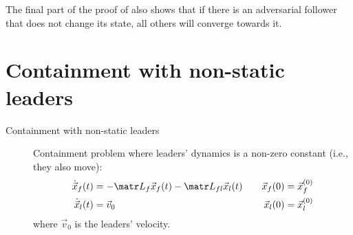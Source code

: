 \begin{remark}
    The final part of the proof of  also shows that if there is an adversarial follower that does not change its state, all others will converge towards it.
\end{remark}


\section{Containment with non-static leaders}

\begin{description}
    \item[Containment with non-static leaders] 
        Containment problem where leaders' dynamics is a non-zero constant (i.e., they also move):
        \[
            \begin{aligned}
                \dot{\x}_f(t) &= -\lap_f \x_f(t) - \lap_{fl} \x_l(t) \quad & \x_f(0) &= \x_f^{(0)} \\
                \dot{\x}_l(t) &= \vec{v}_0 \quad & \x_l(0) &= \x_l^{(0)} \\
            \end{aligned}
        \]
        where $\vec{v}_0$ is the leaders' velocity.
\end{description}

